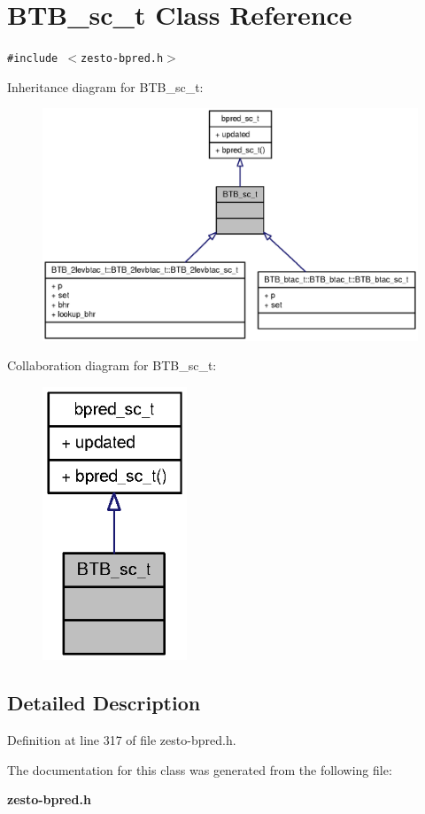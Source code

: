 \section{BTB\_\-sc\_\-t Class Reference}
\label{classBTB__sc__t}
{\tt \#include $<$zesto-bpred.h$>$}

Inheritance diagram for BTB\_\-sc\_\-t:\nopagebreak
\begin{figure}[H]
\begin{center}
\leavevmode
\includegraphics[width=400pt]{classBTB__sc__t__inherit__graph}
\end{center}
\end{figure}
Collaboration diagram for BTB\_\-sc\_\-t:\nopagebreak
\begin{figure}[H]
\begin{center}
\leavevmode
\includegraphics[width=122pt]{classBTB__sc__t__coll__graph}
\end{center}
\end{figure}


\subsection{Detailed Description}


Definition at line 317 of file zesto-bpred.h.

The documentation for this class was generated from the following file:\begin{CompactItemize}
\item 
{\bf zesto-bpred.h}\end{CompactItemize}
